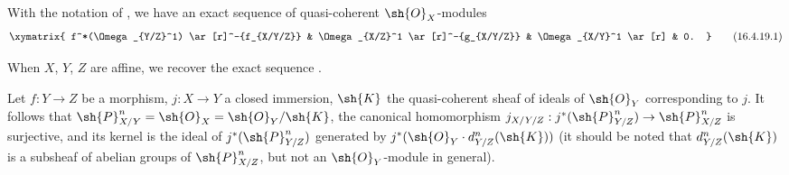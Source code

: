 \begin{corollary}[16.4.19]
\label{IV.16.4.19}
With the notation of , we have an exact sequence of quasi-coherent $\sh{O}_X$-modules 
\[
  \label{IV.16.4.19.1}
  \xymatrix{
    f^*(\Omega_{Y/Z}^1) \ar[r]^-{f_{X/Y/Z}} & \Omega_{X/Z}^1 \ar[r]^-{g_{X/Y/Z}} & \Omega_{X/Y}^1 \ar[r] & 0.
  }
  \tag{16.4.19.1}
\]
\end{corollary}

When $X$, $Y$, $Z$ are affine, we recover the exact sequence .

\begin{proposition}[16.4.20]
\label{IV.16.4.20}
Let $f:Y \to Z$ be a morphism, $j: X \to Y$ a closed immersion, $\sh{K}$ the quasi-coherent sheaf of ideals of $\sh{O}_Y$ corresponding to $j$.
It follows that $\sh{P}_{X/Y}^n = \sh{O}_X = \sh{O}_Y/\sh{K}$, the canonical homomorphism $j_{X/Y/Z}: j^*(\sh{P}_{Y/Z}^n) \to \sh{P}_{X/Z}^n$ is surjective, and its kernel is the ideal of $j^*(\sh{P}_{Y/Z}^n)$ generated by $j^*(\sh{O}_Y \cdot d_{Y/Z}^n(\sh{K}))$ (it should be noted that $d_{Y/Z}^n(\sh{K})$ is a subsheaf of abelian groups of $\sh{P}_{X/Z}^n$, but not an $\sh{O}_Y$-module in general).
\end{proposition}

